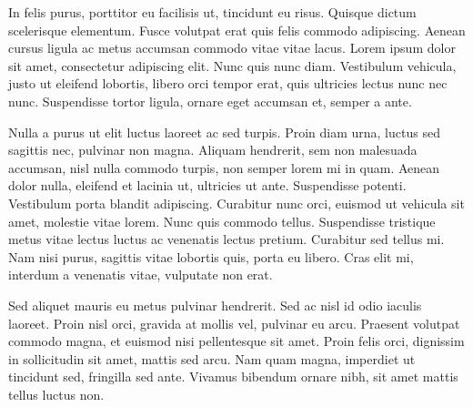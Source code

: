 In felis purus, porttitor eu facilisis ut, tincidunt eu risus. Quisque dictum scelerisque elementum. Fusce volutpat erat quis felis commodo adipiscing. Aenean cursus ligula ac metus accumsan commodo vitae vitae lacus. Lorem ipsum dolor sit amet, consectetur adipiscing elit. Nunc quis nunc diam. Vestibulum vehicula, justo ut eleifend lobortis, libero orci tempor erat, quis ultricies lectus nunc nec nunc. Suspendisse tortor ligula, ornare eget accumsan et, semper a ante.

Nulla a purus ut elit luctus laoreet ac sed turpis. Proin diam urna, luctus sed sagittis nec, pulvinar non magna. Aliquam hendrerit, sem non malesuada accumsan, nisl nulla commodo turpis, non semper lorem mi in quam. Aenean dolor nulla, eleifend et lacinia ut, ultricies ut ante. Suspendisse potenti. Vestibulum porta blandit adipiscing. Curabitur nunc orci, euismod ut vehicula sit amet, molestie vitae lorem. Nunc quis commodo tellus. Suspendisse tristique metus vitae lectus luctus ac venenatis lectus pretium. Curabitur sed tellus mi. Nam nisi purus, sagittis vitae lobortis quis, porta eu libero. Cras elit mi, interdum a venenatis vitae, vulputate non erat.

Sed aliquet mauris eu metus pulvinar hendrerit. Sed ac nisl id odio iaculis laoreet. Proin nisl orci, gravida at mollis vel, pulvinar eu arcu. Praesent volutpat commodo magna, et euismod nisi pellentesque sit amet. Proin felis orci, dignissim in sollicitudin sit amet, mattis sed arcu. Nam quam magna, imperdiet ut tincidunt sed, fringilla sed ante. Vivamus bibendum ornare nibh, sit amet mattis tellus luctus non.

\clearemptydoublepage
